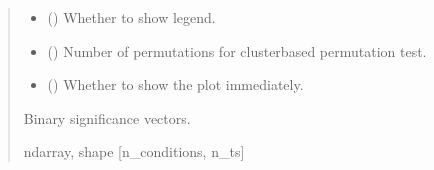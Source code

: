 \documentclass[letterpaper,10pt,english]{sphinxhowto}
\begin{document}
\begin{fulllineitems}
\begin{quote}
\begin{description}
\begin{itemize}
\item {} 
\sphinxAtStartPar
{} (\sphinxstyleliteralemphasis{\sphinxupquote{, }}) \textendash{} Whether to show legend.

\item {} 
\sphinxAtStartPar
{} (\sphinxstyleliteralemphasis{\sphinxupquote{, }}) \textendash{} Number of permutations for cluster\sphinxhyphen{}based permutation test.

\item {} 
\sphinxAtStartPar
{} (\sphinxstyleliteralemphasis{\sphinxupquote{, }}) \textendash{} Whether to show the plot immediately.

\end{itemize}

\sphinxAtStartPar
{} \textendash{} Binary significance vectors.

\sphinxAtStartPar
ndarray, shape {[}n\_conditions, n\_ts{]}

\end{description}\end{quote}

\end{fulllineitems}

\end{document}
